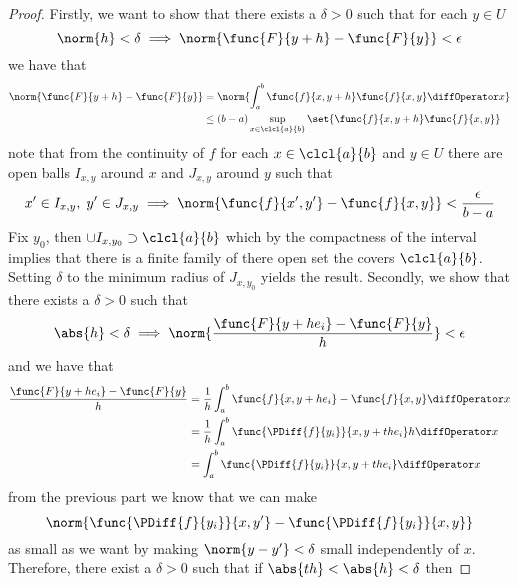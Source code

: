 \begin{proof}
    Firstly, we want to show that there exists a \(\delta > 0\) such that for each \(y \in U\)
    \begin{equation*}
        \norm{h} < \delta \implies  \norm{\func{F}{y + h} - \func{F}{y}} < \epsilon
    \end{equation*}
    we have that
    \begin{align*}
        \norm{\func{F}{y + h} - \func{F}{y}} & =  \norm{\int_{a}^{b} \func{f}{x,y+ h} \func{f}{x,y} \diffOperator x}    \\
                                             & \leq (b-a) \sup_{x \in \clcl{a}{b}} \set{\func{f}{x,y+ h} \func{f}{x,y}}
    \end{align*}
    note that from the continuity of \(f\) for each \(x \in \clcl{a}{b}\) and \(y \in U\) there are open balls \(I_{x,y}\) around \(x\) and \(J_{x,y}\) around \(y\) such that
    \begin{equation*}
        x' \in I_{x,y}, \; y' \in J_{x,y} \implies \norm{\func{f}{x',y'} - \func{f}{x,y}} < \dfrac{\epsilon}{b - a}
    \end{equation*}
    Fix \(y_0\), then \(\cup I_{x,y_0} \supset \clcl{a}{b}\) which by the compactness of the interval implies that there is a finite family of there open set the covers \(\clcl{a}{b}\). Setting \(\delta\) to the minimum radius of \(J_{x,y_0}\) yields the result.
    Secondly, we show that there exists a \(\delta > 0 \) such that
    \begin{equation*}
        \abs{h} < \delta \implies \norm{\dfrac{\func{F}{y + he_i} - \func{F}{y}}{h}} < \epsilon
    \end{equation*}
    and we have that
    \begin{align*}
        \dfrac{\func{F}{y + he_i} - \func{F}{y}}{h} & = \dfrac{1}{h}  \int_{a}^{b} \func{f}{x,y+ he_i} - \func{f}{x,y} \diffOperator x   \\
                                                    & =  \dfrac{1}{h}  \int_{a}^{b} \func{\PDiff{f}{y_i}}{x,y + the_i}h  \diffOperator x \\
                                                    & = \int_{a}^{b} \func{\PDiff{f}{y_i}}{x,y + the_i}  \diffOperator x
    \end{align*}
    from the previous part we know that we can make
    \begin{equation*}
        \norm{\func{\PDiff{f}{y_i}}{x,y'} - \func{\PDiff{f}{y_i}}{x,y}}
    \end{equation*}
    as small as we want by making \(\norm{y - y'} < \delta\) small independently of \(x\). Therefore, there exist a \(\delta > 0\) such that if \(\abs{th} < \abs{h} < \delta\) then

\end{proof}
